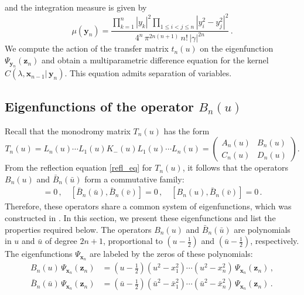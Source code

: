 \documentclass[a4paper,11pt]{article}
\numberwithin{equation}{section}
\begin{document}
and the integration measure is given by
\begin{equation}\label{measure}
    \mu(\bm{y}_n) =
    \frac{\prod\limits_{k=1}^n|y_k|^2 \prod\limits_{1\leq i<j\leq n}|y_i^2-y_j^2|^2}{4^n\,\pi^{2n(n+1)}\,n!\,|\gamma|^{2n}} \,.
\end{equation}
We compute the action of the transfer matrix $t_n(u)$ on the eigenfunction $\Psi_{\bm{y}_{n}}(\bm{z}_n)$ and obtain a multiparametric difference equation for the kernel $C(\lambda, \bm{x}_{n-1}|\,\bm{y}_n)$. This equation admits separation of variables.


\subsection{Eigenfunctions of the operator $B_n(u)$}

Recall that the monodromy matrix $T_n(u)$ has the form
\begin{equation*}
    T_n(u) = L_n(u) \cdots L_1(u) K_-(u) L_1(u) \cdots L_n(u) = \begin{pmatrix}
        A_n(u) & B_n(u) \\
        C_n(u) & D_n(u)
    \end{pmatrix} .
\end{equation*}
From the reflection equation \eqref{refl_eq} for $T_n(u)$, it follows that the operators $B_n(u)$ and $\bar{B}_n(\bar{u})$ form a commutative family:
\begin{align*}
    [B_n(u), B_n(v)] = 0 \,, \quad [\bar{B}_n(\bar{u}), \bar{B}_n(\bar{v})] = 0 \,, \quad [B_n(u), \bar{B}_n(\bar{v})] = 0 \,.
\end{align*}
Therefore, these operators share a common system of eigenfunctions, which was constructed in \cite{ADV2}. In this section, we present these eigenfunctions and list the properties required below. The operators $B_n(u)$ and $\bar{B}_n(\bar{u})$ are polynomials in $u$ and $\bar{u}$ of degree $2n+1$, proportional to $(u-\frac{1}{2})$ and $(\bar{u}-\frac{1}{2})$, respectively. The eigenfunctions $\Psi_{\bm{x}_n}$ are labeled by the zeros of these polynomials:
\begin{equation} \nonumber
    \begin{aligned}
        B_{n}(u)\,\Psi_{\bm{x}_n}(\bm{z}_n) &= 
        \left(u - \tfrac{1}{2} \right)\left(u^2-x^2_1\right)\cdots
        \left(u^2-x^2_{n}\right)\,
        \Psi_{\bm{x}_n}(\bm{z}_n) \,, \\
        \bar{B}_{n}(\bar{u})\,\Psi_{\bm{x}_n}(\bm{z}_n) &= 
        \left(\bar{u} - \tfrac{1}{2} \right)\left(\bar{u}^2-\bar{x}^2_1\right)\cdots
        \left(\bar{u}^2-\bar{x}^2_{n}\right)\,
        \Psi_{\bm{x}_n}(\bm{z}_n) \,.
    \end{aligned}
\end{equation}
\end{document}
